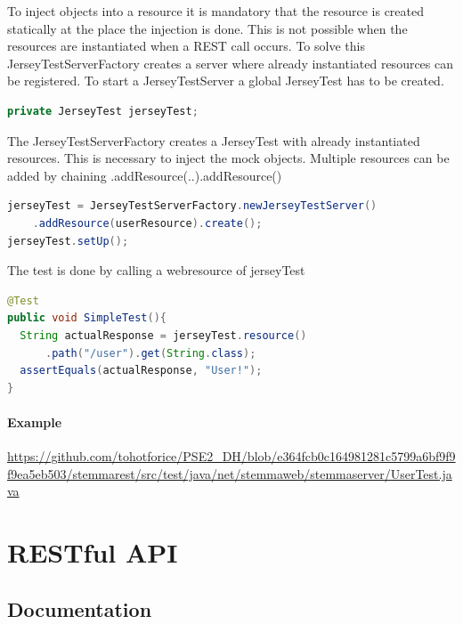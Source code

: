 \documentclass[11pt,fleqn,openany]{book} %
\begin{document}
To inject objects into a resource it is mandatory that the resource is created statically at the place the injection is done. This is not possible when the resources are instantiated when a REST call occurs. To solve this JerseyTestServerFactory creates a server where already instantiated resources can be registered. 
To start a JerseyTestServer a global JerseyTest has to be created.
\begin{lstlisting}[language=java]
private JerseyTest jerseyTest;
\end{lstlisting}
The JerseyTestServerFactory creates a JerseyTest with already instantiated resources. This is necessary to inject the mock objects. Multiple resources can be added by chaining .addResource(..).addResource()
\begin{lstlisting}[language=java]
jerseyTest = JerseyTestServerFactory.newJerseyTestServer()
	.addResource(userResource).create();
jerseyTest.setUp();
\end{lstlisting}

The test is done by calling a webresource of jerseyTest
\begin{lstlisting}[language=java]
@Test
public void SimpleTest(){
  String actualResponse = jerseyTest.resource()
      .path("/user").get(String.class);
  assertEquals(actualResponse, "User!");
}
\end{lstlisting}

\subsection*{Example}
\url{https://github.com/tohotforice/PSE2_DH/blob/e364fcb0c164981281c5799a6bf9f9f9ea5eb503/stemmarest/src/test/java/net/stemmaweb/stemmaserver/UserTest.java}

\part{RESTful API}



\chapter{Documentation}
\end{document}
